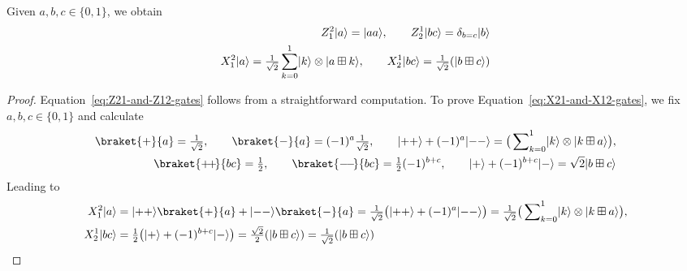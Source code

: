 \documentclass[a4paper, oneside, 12pt]{amsart}
\begin{document}
\begin{lemma}\label{lem:CNOT-auxiliary-XZ}
  Given \(a, b,c \in\{0,1\}\), we obtain
  \begin{subequations}
    \begin{align}
      Z_{1}^{2} \lvert a\rangle  = \lvert aa\rangle, \qquad
      Z_{2}^{1} \lvert bc\rangle = \delta_{b=c}\lvert b\rangle \label{eq:Z21-and-Z12-gates}\\
      X_{1}^{2} \lvert a\rangle  = \tfrac{1}{\sqrt{2}} \sum_{k=0}^{1} \lvert k\rangle\otimes \lvert a \boxplus k\rangle, \qquad
      X_{2}^{1} \lvert bc\rangle = \tfrac{1}{\sqrt{2}}(\lvert b \boxplus c\rangle) \label{eq:X21-and-X12-gates}
    \end{align}
  \end{subequations}
\end{lemma}
\begin{proof}
  Equation~\eqref{eq:Z21-and-Z12-gates} follows from a straightforward computation.
  To prove Equation~\eqref{eq:X21-and-X12-gates}, we fix \(a, b,c \in\{0,1\}\) and calculate
  \begin{align*}
    \braket{+}{a} = \tfrac{1}{\sqrt2}, \qquad
    \braket{-}{a} = (-1)^{a} \tfrac{1}{\sqrt{2}},
    \qquad
    \ket{++} + (-1)^{a} \ket{--} = \big(\sum\nolimits_{k=0}^{1} \ket{k} \otimes \ket{k \boxplus a}\big), \\
    \braket{+\!+\!}{bc} = \tfrac{1}{2}, \qquad
    \braket{-\!-\!}{bc} = \tfrac{1}{2} (-1)^{b+c},\qquad
    \ket{+} + (-1)^{b+c} \ket{-} = \sqrt{2}\ket{b \boxplus c}
  \end{align*}
  Leading to
  \begin{align*}
    X_{1}^{2}\ket{a}
    & = \ket{++}\braket{+}{a} + \ket{--}\braket{-}{a}
      = \tfrac{1}{\sqrt{2}}\big(\ket{++} + (-1)^{a} \ket{--}\big)
      = \tfrac{1}{\sqrt{2}} \big(\sum\nolimits_{k=0}^{1} \ket{k} \otimes \ket{k \boxplus a}\big), \\
    X_{2}^{1}\ket{bc}
    & = \tfrac{1}{2}\big(\ket{+} + (-1)^{b+c}\ket{-}\big)
      = \tfrac{\sqrt{2}}{2}(\ket{b \boxplus c})
      = \tfrac{1}{\sqrt{2}}(\ket{b \boxplus c})\qedhere
  \end{align*}
\end{proof}
\end{document}
